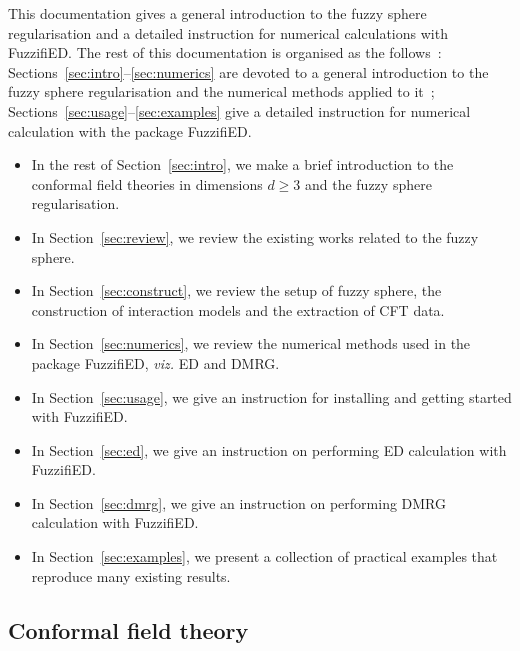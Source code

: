 \documentclass{timesjhep}
\begin{document}
This documentation gives a general introduction to the fuzzy sphere regularisation and a detailed instruction for numerical calculations with FuzzifiED. The rest of this documentation is organised as the follows~: Sections~\ref{sec:intro}--\ref{sec:numerics} are devoted to a general introduction to the fuzzy sphere regularisation and the numerical methods applied to it~; Sections~\ref{sec:usage}--\ref{sec:examples} give a detailed instruction for numerical calculation with the package FuzzifiED. 
\begin{itemize}
    \item In the rest of Section~\ref{sec:intro}, we make a brief introduction to the conformal field theories in dimensions $d\ge 3$ and the fuzzy sphere regularisation. 
    \item In Section~\ref{sec:review}, we review the existing works related to the fuzzy sphere. 
    \item In Section~\ref{sec:construct}, we review the setup of fuzzy sphere, the construction of interaction models and the extraction of CFT data.
    \item In Section~\ref{sec:numerics}, we review the numerical methods used in the package FuzzifiED, \textit{viz.} ED and DMRG. 
    \item In Section~\ref{sec:usage}, we give an instruction for installing and getting started with FuzzifiED. 
    \item In Section~\ref{sec:ed}, we give an instruction on performing ED calculation with FuzzifiED. 
    \item In Section~\ref{sec:dmrg}, we give an instruction on performing DMRG calculation with FuzzifiED. 
    \item In Section~\ref{sec:examples}, we present a collection of practical examples that reproduce many existing results.
\end{itemize}

\subsection{Conformal field theory}
\end{document}
